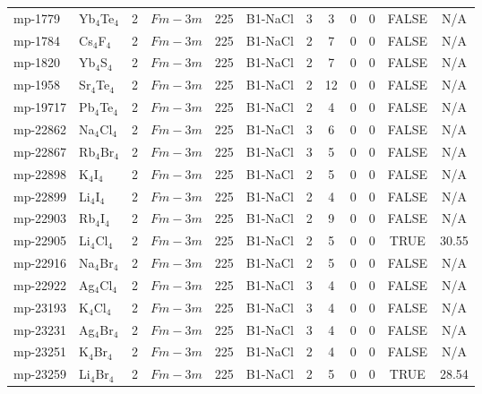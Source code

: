 {\begin{longtable}{llcccccccccc}
    mp-1779 & Yb$_{4}$Te$_{4}$ & 2     & $Fm-3m$ & 225   & B1-NaCl & 3     & 3     & 0     & 0     & FALSE & N/A \\
    mp-1784 & Cs$_{4}$F$_{4}$ & 2     & $Fm-3m$ & 225   & B1-NaCl & 2     & 7     & 0     & 0     & FALSE & N/A \\
    mp-1820 & Yb$_{4}$S$_{4}$ & 2     & $Fm-3m$ & 225   & B1-NaCl & 2     & 7     & 0     & 0     & FALSE & N/A \\
    mp-1958 & Sr$_{4}$Te$_{4}$ & 2     & $Fm-3m$ & 225   & B1-NaCl & 2     & 12    & 0     & 0     & FALSE & N/A \\
    mp-19717 & Pb$_{4}$Te$_{4}$ & 2     & $Fm-3m$ & 225   & B1-NaCl & 2     & 4     & 0     & 0     & FALSE & N/A \\
    mp-22862 & Na$_{4}$Cl$_{4}$ & 2     & $Fm-3m$ & 225   & B1-NaCl & 3     & 6     & 0     & 0     & FALSE & N/A \\
    mp-22867 & Rb$_{4}$Br$_{4}$ & 2     & $Fm-3m$ & 225   & B1-NaCl & 3     & 5     & 0     & 0     & FALSE & N/A \\
    mp-22898 & K$_{4}$I$_{4}$ & 2     & $Fm-3m$ & 225   & B1-NaCl & 2     & 5     & 0     & 0     & FALSE & N/A \\
    mp-22899 & Li$_{4}$I$_{4}$ & 2     & $Fm-3m$ & 225   & B1-NaCl & 2     & 4     & 0     & 0     & FALSE & N/A \\
    mp-22903 & Rb$_{4}$I$_{4}$ & 2     & $Fm-3m$ & 225   & B1-NaCl & 2     & 9     & 0     & 0     & FALSE & N/A \\
    mp-22905 & Li$_{4}$Cl$_{4}$ & 2     & $Fm-3m$ & 225   & B1-NaCl & 2     & 5     & 0     & 0     & TRUE  & 30.55  \\
    mp-22916 & Na$_{4}$Br$_{4}$ & 2     & $Fm-3m$ & 225   & B1-NaCl & 2     & 5     & 0     & 0     & FALSE & N/A \\
    mp-22922 & Ag$_{4}$Cl$_{4}$ & 2     & $Fm-3m$ & 225   & B1-NaCl & 3     & 4     & 0     & 0     & FALSE & N/A \\
    mp-23193 & K$_{4}$Cl$_{4}$ & 2     & $Fm-3m$ & 225   & B1-NaCl & 3     & 4     & 0     & 0     & FALSE & N/A \\
    mp-23231 & Ag$_{4}$Br$_{4}$ & 2     & $Fm-3m$ & 225   & B1-NaCl & 3     & 4     & 0     & 0     & FALSE & N/A \\
    mp-23251 & K$_{4}$Br$_{4}$ & 2     & $Fm-3m$ & 225   & B1-NaCl & 2     & 4     & 0     & 0     & FALSE & N/A \\
    mp-23259 & Li$_{4}$Br$_{4}$ & 2     & $Fm-3m$ & 225   & B1-NaCl & 2     & 5     & 0     & 0     & TRUE  & 28.54  \\

\end{longtable}}
